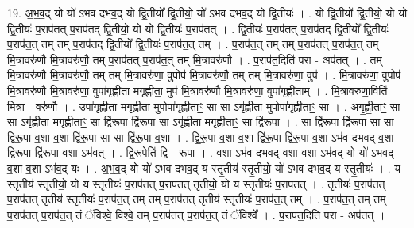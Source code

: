 \documentclass[17pt]{extarticle}
\begin{document}
19. अ॒भ॒व॒द् यो यो॑ ऽभव दभव॒द् यो द्वि॒तीयो᳚ द्वि॒तीयो॒ यो॑ ऽभव दभव॒द् यो द्वि॒तीयः॑ । . यो द्वि॒तीयो᳚ द्वि॒तीयो॒ यो यो द्वि॒तीयः॑ प॒राप॑तत् प॒राप॑तद् द्वि॒तीयो॒ यो यो द्वि॒तीयः॑ प॒राप॑तत् । . द्वि॒तीयः॑ प॒राप॑तत् प॒राप॑तद् द्वि॒तीयो᳚ द्वि॒तीयः॑ प॒राप॑त॒त् तम् तम् प॒राप॑तद् द्वि॒तीयो᳚ द्वि॒तीयः॑ प॒राप॑त॒त् तम् । . प॒राप॑त॒त् तम् तम् प॒राप॑तत् प॒राप॑त॒त् तम् मि॒त्रावरु॑णौ मि॒त्रावरु॑णौ॒ तम् प॒राप॑तत् प॒राप॑त॒त् तम् मि॒त्रावरु॑णौ । . प॒राप॑त॒दिति॑ परा - अप॑तत् । . तम् मि॒त्रावरु॑णौ मि॒त्रावरु॑णौ॒ तम् तम् मि॒त्रावरु॑णा॒ वुपोप॑ मि॒त्रावरु॑णौ॒ तम् तम् मि॒त्रावरु॑णा॒ वुप॑ । . मि॒त्रावरु॑णा॒ वुपोप॑ मि॒त्रावरु॑णौ मि॒त्रावरु॑णा॒ वुपा॑गृह्णीता मगृह्णीता॒ मुप॑ मि॒त्रावरु॑णौ मि॒त्रावरु॑णा॒ वुपा॑गृह्णीताम् । . मि॒त्रावरु॑णा॒विति॑ मि॒त्रा - वरु॑णौ । . उपा॑गृह्णीता मगृह्णीता॒ मुपोपा॑गृह्णीताꣳ॒॒ सा सा ऽगृ॑ह्णीता॒ मुपोपा॑गृह्णीताꣳ॒॒ सा । . अ॒गृ॒ह्णी॒ताꣳ॒॒ सा सा ऽगृ॑ह्णीता मगृह्णीताꣳ॒॒ सा द्वि॑रू॒पा द्वि॑रू॒पा सा ऽगृ॑ह्णीता मगृह्णीताꣳ॒॒ सा द्वि॑रू॒पा । . सा द्वि॑रू॒पा द्वि॑रू॒पा सा सा द्वि॑रू॒पा व॒शा व॒शा द्वि॑रू॒पा सा सा द्वि॑रू॒पा व॒शा । . द्वि॒रू॒पा व॒शा व॒शा द्वि॑रू॒पा द्वि॑रू॒पा व॒शा ऽभ॑व दभवद् व॒शा द्वि॑रू॒पा द्वि॑रू॒पा व॒शा ऽभ॑वत् । . द्वि॒रू॒पेति॑ द्वि - रू॒पा । . व॒शा ऽभ॑व दभवद् व॒शा व॒शा ऽभ॑व॒द् यो यो॑ ऽभवद् व॒शा व॒शा ऽभ॑व॒द् यः । . अ॒भ॒व॒द् यो यो॑ ऽभव दभव॒द् य स्तृ॒तीय॑ स्तृ॒तीयो॒ यो॑ ऽभव दभव॒द् य स्तृ॒तीयः॑ । . य स्तृ॒तीय॑ स्तृ॒तीयो॒ यो य स्तृ॒तीयः॑ प॒राप॑तत् प॒राप॑तत् तृ॒तीयो॒ यो य स्तृ॒तीयः॑ प॒राप॑तत् । . तृ॒तीयः॑ प॒राप॑तत् प॒राप॑तत् तृ॒तीय॑ स्तृ॒तीयः॑ प॒राप॑त॒त् तम् तम् प॒राप॑तत् तृ॒तीय॑ स्तृ॒तीयः॑ प॒राप॑त॒त् तम् । . प॒राप॑त॒त् तम् तम् प॒राप॑तत् प॒राप॑त॒त् तं ॅविश्वे॒ विश्वे॒ तम् प॒राप॑तत् प॒राप॑त॒त् तं ॅविश्वे᳚ । . प॒राप॑त॒दिति॑ परा - अप॑तत् । \newline
\end{document}
